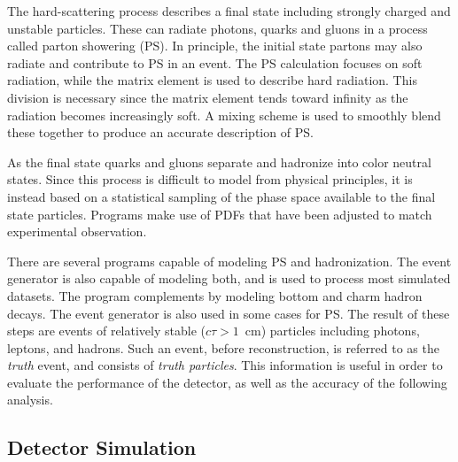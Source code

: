 The hard-scattering process describes a final state including strongly charged and unstable particles.
These can radiate photons, quarks and gluons in a process called parton showering (PS).
In principle, the initial state partons may also radiate and contribute to PS in an event.
The PS calculation focuses on soft radiation, while the matrix element is used to describe hard radiation.
This division is necessary since the matrix element tends toward infinity as the radiation becomes increasingly soft.
A mixing scheme is used to smoothly blend these together to produce an accurate description of PS.

As the final state quarks and gluons separate and hadronize into color neutral states.
Since this process is difficult to model from physical principles, it is instead based on a statistical sampling of the phase space available to the final state particles.
Programs make use of PDFs that have been adjusted to match experimental observation.

There are several programs capable of modeling PS and hadronization.
The event generator \pythia is also capable of modeling both, and is used to process most simulated datasets.
The program \evtgen \cite{Lange:2001uf} complements \pythia by modeling bottom and charm hadron decays.
The event generator \sherpa is also used in some cases for PS.
The result of these steps are events of relatively stable ($c\tau>1$~cm) particles including photons, leptons, and hadrons.
Such an event, before reconstruction, is referred to as the \emph{truth} event, and consists of \emph{truth particles}.
This information is useful in order to evaluate the performance of the detector, as well as the accuracy of the following analysis.



\subsection{Detector Simulation} \label{sec:geant}

